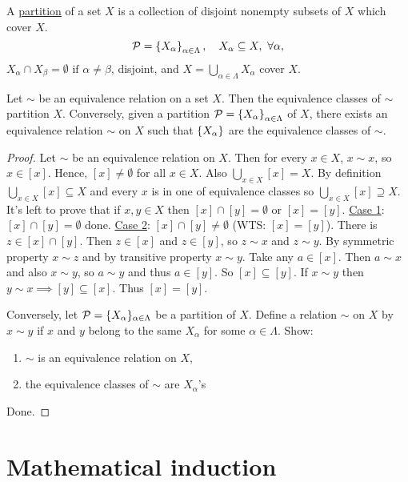 \documentclass[]{article}
\begin{document}
\begin{definition}
	A \ul{partition} of a set $X$ is a collection of disjoint nonempty subsets of $X$ which cover $X$.
	$$\mathcal{P} = \left\{ X_\alpha \right\}_{\alpha\in \Lambda}, \quad X_\alpha\subseteq X,\ \forall \alpha,$$
	$X_\alpha \cap X_\beta = \emptyset \text{ if } \alpha \neq \beta$, disjoint, and $X = \bigcup_{\alpha\in\Lambda} X_\alpha$ cover $X$.
\end{definition}
\begin{theorem}
	Let $\sim $ be an equivalence relation on a set $X$. Then the equivalence classes of $\sim$ partition $X$. Conversely, given a partition $\mathcal{P} = \left\{ X_\alpha \right\}_{\alpha\in\Lambda}$ of $X$, there exists an equivalence relation $\sim$ on $X$ such that $\left\{ X_\alpha \right\}$ are the equivalence classes of $\sim$.
\end{theorem}
\begin{proof}
	Let $\sim$ be an equivalence relation on $X$. Then for every $x\in X$, $x\sim x$, so $x\in [x]$. Hence, $[x]\neq \emptyset$ for all $x\in X$. Also $\bigcup_{x\in X}[x] = X$. By definition $\bigcup_{x\in X}[x] \subseteq X$ and  every $x$ is in one of equivalence classes so $\bigcup_{x\in X}[x] \supseteq X$. It's left to prove that if $x,y\in X$ then $[x]\cap [y] = \emptyset$ or $[x]=[y]$.
	\ul{Case 1}: $[x]\cap[y] = \emptyset$ done. \ul{Case 2}: $[x]\cap[y]\neq \emptyset$ (WTS: $[x]=[y]$). There is $z\in[x]\cap[y]$. Then $z\in[x]$ and $z\in[y]$, so $z\sim x$ and $z\sim y$. By symmetric property $x\sim z$ and by transitive property $x\sim y$. Take any $a\in [x]$. Then $a\sim x$ and also $x\sim y$, so $a\sim y$ and thus $a\in [y]$. So $[x]\subseteq [y]$. If $x\sim y$ then $y\sim x \implies [y]\subseteq [x]$. Thus $[x]=[y]$.
	
	Conversely, let $\mathcal{P} = \{X_\alpha\}_{\alpha\in\Lambda}$ be a partition of $X$. Define a relation $\sim$ on $X$ by $x\sim y$ if $x$ and $y$ belong to the same $X_\alpha$ for some $\alpha\in\Lambda$. Show:
	\begin{enumerate}
		\item $\sim$ is an equivalence relation on $X$,
		\item the equivalence classes of $\sim$ are $X_\alpha$'s
	\end{enumerate}
	Done.
\end{proof}

\section*{Mathematical induction}
\end{document}
